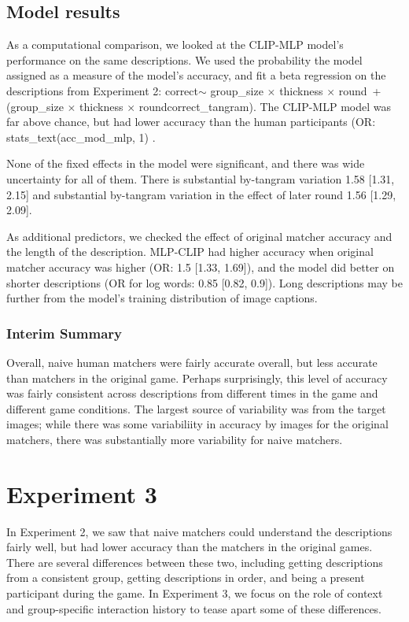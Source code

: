 \documentclass[10pt, letterpaper]{article}
\begin{document}
\subsection{Model results}\label{model-results}

As a computational comparison, we looked at the CLIP-MLP model's
performance on the same descriptions. We used the probability the model
assigned as a measure of the model's accuracy, and fit a beta regression
on the descriptions from Experiment 2: correct\(\sim\) group\_size
\(\times\) thickness \(\times\) round~+ (group\_size \(\times\)
thickness \(\times\) round\textbar correct\_tangram). The CLIP-MLP model
was far above chance, but had lower accuracy than the human participants
(OR: stats\_text(acc\_mod\_mlp, 1) .

None of the fixed effects in the model were significant, and there was
wide uncertainty for all of them. There is substantial by-tangram
variation 1.58 {[}1.31, 2.15{]} and substantial by-tangram variation in
the effect of later round 1.56 {[}1.29, 2.09{]}.

As additional predictors, we checked the effect of original matcher
accuracy and the length of the description. MLP-CLIP had higher accuracy
when original matcher accuracy was higher (OR: 1.5 {[}1.33, 1.69{]}),
and the model did better on shorter descriptions (OR for log words: 0.85
{[}0.82, 0.9{]}). Long descriptions may be further from the model's
training distribution of image captions.

\subsubsection{Interim Summary}\label{interim-summary}

Overall, naive human matchers were fairly accurate overall, but less
accurate than matchers in the original game. Perhaps surprisingly, this
level of accuracy was fairly consistent across descriptions from
different times in the game and different game conditions. The largest
source of variability was from the target images; while there was some
variabiliity in accuracy by images for the original matchers, there was
substantially more variability for naive matchers.

\section{Experiment 3}\label{experiment-3}

In Experiment 2, we saw that naive matchers could understand the
descriptions fairly well, but had lower accuracy than the matchers in
the original games. There are several differences between these two,
including getting descriptions from a consistent group, getting
descriptions in order, and being a present participant during the game.
In Experiment 3, we focus on the role of context and group-specific
interaction history to tease apart some of these differences.
\end{document}
